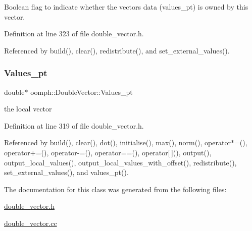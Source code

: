 Boolean flag to indicate whether the vector\textquotesingle{}s data (values\+\_\+pt) is owned by this vector. 



Definition at line 323 of file double\+\_\+vector.\+h.



Referenced by build(), clear(), redistribute(), and set\+\_\+external\+\_\+values().

\mbox{\label{classoomph_1_1DoubleVector_abbb699b9364ece68a4cb483291c04c25}} 
\subsubsection{\texorpdfstring{Values\+\_\+pt}{Values\_pt}}
{\footnotesize\ttfamily double$\ast$ oomph\+::\+Double\+Vector\+::\+Values\+\_\+pt\hspace{0.3cm}{\ttfamily [private]}}



the local vector 



Definition at line 319 of file double\+\_\+vector.\+h.



Referenced by build(), clear(), dot(), initialise(), max(), norm(), operator$\ast$=(), operator+=(), operator-\/=(), operator==(), operator\mbox{[}$\,$\mbox{]}(), output(), output\+\_\+local\+\_\+values(), output\+\_\+local\+\_\+values\+\_\+with\+\_\+offset(), redistribute(), set\+\_\+external\+\_\+values(), and values\+\_\+pt().



The documentation for this class was generated from the following files\+:\begin{DoxyCompactItemize}
\item 
\hyperlink{double__vector_8h}{double\+\_\+vector.\+h}\item 
\hyperlink{double__vector_8cc}{double\+\_\+vector.\+cc}\end{DoxyCompactItemize}
